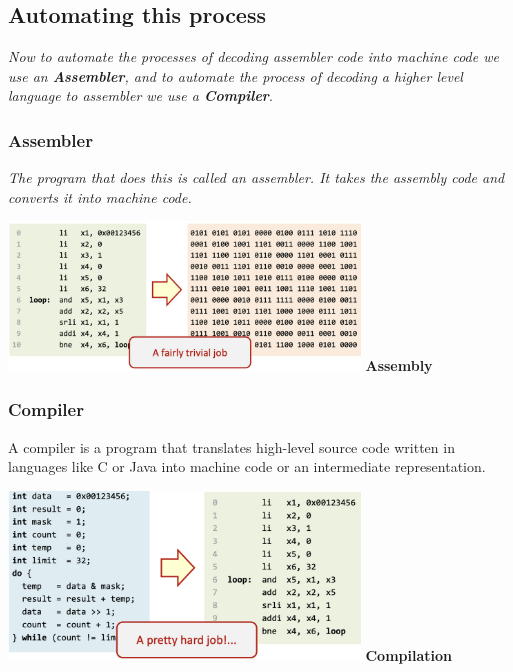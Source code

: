 \newpage
\subsection{Automating this process}
\textit{Now to automate the processes of decoding assembler code into machine code we use an \textbf{Assembler}, and to automate the process of decoding a higher level language to assembler we use a \textbf{Compiler}}. \newline
\subsubsection{Assembler}
\textit{The program that does this is called an assembler. It takes the assembly code and converts it into machine code.} \newline
\begin{center}
    \includegraphics[width=0.7\textwidth]{chapters/chapter1a/images/assembler.png}
    \centering
    \textbf{Assembly}
\end{center}
\subsubsection{Compiler}
A compiler is a program that translates high-level source code written in languages like C or Java into machine code or an intermediate representation. 
\begin{center}
    \includegraphics[width=0.7\textwidth]{chapters/chapter1a/images/compiler.png}
    \centering
    \textbf{Compilation}
\end{center}


